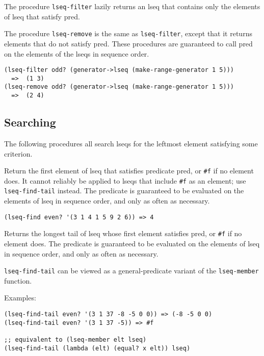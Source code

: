\begin{entry}{%
  }

  The procedure \texttt{lseq-filter} lazily returns an lseq that
  contains only the elements of lseq that satisfy pred.

  The procedure \texttt{lseq-remove} is the same as
  \texttt{lseq-filter}, except that it returns elements that do not
  satisfy pred. These procedures are guaranteed to call pred on the
  elements of the lseqs in sequence order.

\begin{verbatim}
(lseq-filter odd? (generator->lseq (make-range-generator 1 5)))
  =>  (1 3)
(lseq-remove odd? (generator->lseq (make-range-generator 1 5)))
  =>  (2 4)
\end{verbatim}
\end{entry}

\subsection{{Searching}}\label{searching}

The following procedures all search lseqs for the leftmost element
satisfying some criterion.

\begin{entry}{%
  }

  Return the first element of lseq that satisfies predicate pred, or
  \texttt{\#f} if no element does. It cannot reliably be applied to
  lseqs that include \texttt{\#f} as an element; use
  \texttt{lseq-find-tail} instead. The predicate is guaranteed to be
  evaluated on the elements of lseq in sequence order, and only as
  often as necessary.

\begin{verbatim}
(lseq-find even? '(3 1 4 1 5 9 2 6)) => 4
\end{verbatim}
\end{entry}

\begin{entry}{%
  }

  Returns the longest tail of lseq whose first element satisfies pred,
  or \texttt{\#f} if no element does. The predicate is guaranteed to
  be evaluated on the elements of lseq in sequence order, and only as
  often as necessary.

  \texttt{lseq-find-tail} can be viewed as a general-predicate variant
  of the \texttt{lseq-member} function.

  Examples:

\begin{verbatim}
(lseq-find-tail even? '(3 1 37 -8 -5 0 0)) => (-8 -5 0 0)
(lseq-find-tail even? '(3 1 37 -5)) => #f

;; equivalent to (lseq-member elt lseq)
(lseq-find-tail (lambda (elt) (equal? x elt)) lseq)
\end{verbatim}
\end{entry}

